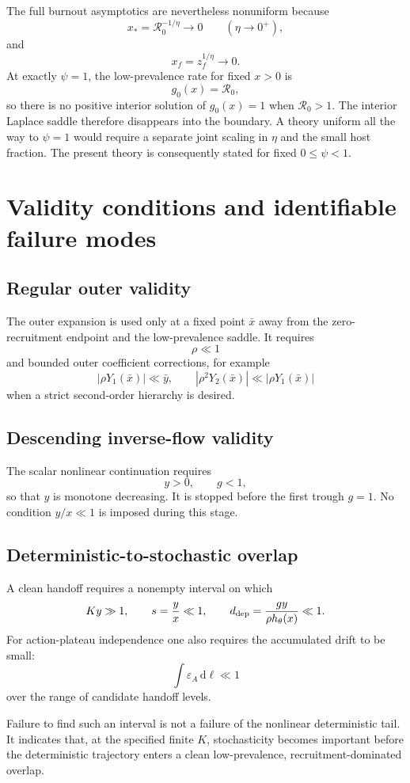 \documentclass[11pt]{article}
\newcommand{\Rzero}{\mathcal R_0}
\newcommand{\hth}{h_\theta}
\newcommand{\xf}{x_f}
\newcommand{\xs}{x_*}
\newcommand{\dd}{\,\mathrm{d}}
\newcommand{\gh}{g_0}
\newcommand{\epsA}{\varepsilon_A}
\begin{document}
The full burnout asymptotics are nevertheless nonuniform because
\[
\xs=\Rzero^{-1/\eta}\to0
\qquad(\eta\to0^+),
\]
and
\[
\xf=z_f^{1/\eta}\to0.
\]
At exactly $\psi=1$, the low-prevalence rate for fixed $x>0$ is
\[
\gh(x)=\Rzero,
\]
so there is no positive interior solution of $\gh(x)=1$ when $\Rzero>1$. The interior Laplace saddle therefore disappears into the boundary. A theory uniform all the way to $\psi=1$ would require a separate joint scaling in $\eta$ and the small host fraction. The present theory is consequently stated for fixed $0\leq\psi<1$.

\section{Validity conditions and identifiable failure modes}

\subsection{Regular outer validity}
The outer expansion is used only at a fixed point $\bar x$ away from the zero-recruitment endpoint and the low-prevalence saddle. It requires
\[
\rho\ll1
\]
and bounded outer coefficient corrections, for example
\[
|\rho Y_1(\bar x)|\ll\bar y,
\qquad
|\rho^2Y_2(\bar x)|\ll|\rho Y_1(\bar x)|
\]
when a strict second-order hierarchy is desired.

\subsection{Descending inverse-flow validity}
The scalar nonlinear continuation requires
\[
y>0,
\qquad
g<1,
\]
so that $y$ is monotone decreasing. It is stopped before the first trough $g=1$. No condition $y/x\ll1$ is imposed during this stage.

\subsection{Deterministic-to-stochastic overlap}
A clean handoff requires a nonempty interval on which
\[
Ky\gg1,
\qquad
s=\frac yx\ll1,
\qquad
d_{\rm dep}=\frac{gy}{\rho\hth(x)}\ll1.
\]
For action-plateau independence one also requires the accumulated drift to be small:
\[
\int\epsA\dd\ell\ll1
\]
over the range of candidate handoff levels.

Failure to find such an interval is not a failure of the nonlinear deterministic tail. It indicates that, at the specified finite $K$, stochasticity becomes important before the deterministic trajectory enters a clean low-prevalence, recruitment-dominated overlap.
\end{document}
